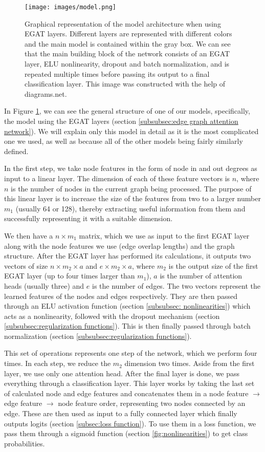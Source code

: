 \documentclass[times, utf8, diplomski, english]{fer_eng}
\begin{document}
\begin{figure}
	\centering
	\texttt{[image: images/model.png]}
	\caption[Model]{Graphical representation of the model architecture when using EGAT layers. Different layers are represented with different colors and the main model is contained within the gray box. We can see that the main building block of the network consists of an EGAT layer, ELU nonlinearity, dropout and batch normalization, and is repeated multiple times before passing its output to a final classification layer. This image was constructed with the help of diagrams.net\footnotemark{}.}
	\label{fig:model}
\end{figure}

In Figure \ref{fig:model}, we can see the general structure of one of our models, specifically, the model using the EGAT layers (section \ref{subsubsec:edge graph attention network}). We will explain only this model in detail as it is the most complicated one we used, as well as because all of the other models being fairly similarly defined.

In the first step, we take node features in the form of node in and out degrees as input to a linear layer. The dimension of each of these feature vectors is $n$, where $n$ is the number of nodes in the current graph being processed. The purpose of this linear layer is to increase the size of the features from two to a larger number $m_1$ (usually 64 or 128), thereby extracting useful information from them and successfully representing it with a suitable dimension.

We then have a $n \times m_1$ matrix, which we use as input to the first EGAT layer along with the node features we use (edge overlap lengths) and the graph structure. After the EGAT layer has performed its calculations, it outputs two vectors of size $n \times m_2 \times a$ and $e \times m_2 \times a$, where $m_2$ is the output size of the first EGAT layer (up to four times larger than $m_1$), $a$ is the number of attention heads (usually three) and $e$ is the number of edges. The two vectors represent the learned features of the nodes and edges respectively. They are then passed through an ELU activation function (section \ref{subsubsec: nonlinearities}) which acts as a nonlinearity, followed with the dropout mechanism (section \ref{subsubsec:regularization functions}). This is then finally passed through batch normalization (section \ref{subsubsec:regularization functions}).

This set of operations represents one step of the network, which we perform four times. In each step, we reduce the $m_2$ dimension two times. Aside from the first layer, we use only one attention head. After the final layer is done, we pass everything through a classification layer. This layer works by taking the last set of calculated node and edge features and concatenates them in a node feature $\rightarrow$ edge feature $\rightarrow$ node feature order, representing two nodes connected by an edge. These are then used as input to a fully connected layer which finally outputs logits (section \ref{subsec:loss function}). To use them in a loss function, we pass them through a sigmoid function (section \ref{fig:nonlinearities}) to get class probabilities.
\end{document}
